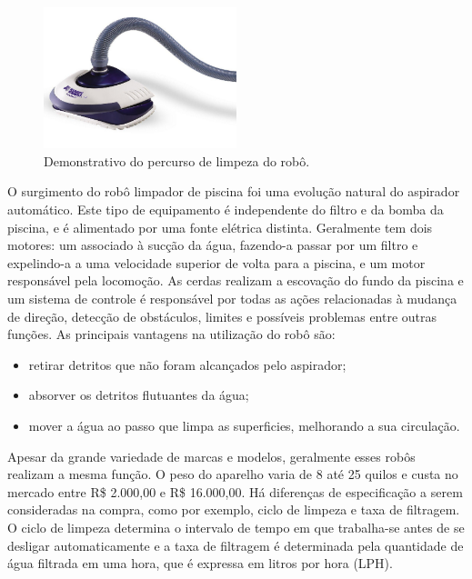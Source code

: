 \begin{figure}[h]
    \centering
    \includegraphics[width=0.5\textwidth]{figures/limpa_piscina_auto.png}
    \caption{Demonstrativo do percurso de limpeza do robô.}
    \label{fig:schema-way-robot}
  \end{figure}

O surgimento do robô limpador de piscina foi uma evolução natural do aspirador 
automático. Este tipo de equipamento é independente do filtro e da bomba da 
piscina, e é alimentado por uma fonte elétrica distinta. Geralmente tem dois 
motores: um associado à sucção da água, fazendo-a passar por um filtro e 
expelindo-a a uma velocidade superior de volta para a piscina, e um motor 
responsável pela locomoção. As cerdas realizam a escovação do fundo da piscina 
e um sistema de controle é responsável por todas as ações relacionadas à 
mudança de direção, detecção de obstáculos, limites e possíveis problemas entre
outras funções. As principais vantagens na utilização do robô são:

\begin{itemize}
  \item retirar detritos que não foram alcançados pelo aspirador;
  \item absorver os detritos flutuantes da água;
  \item mover a água ao passo que limpa as superficies, melhorando a sua circulação.
\end{itemize}
 
Apesar da grande variedade de marcas e modelos, geralmente esses robôs realizam
a mesma função. O peso do aparelho varia de 8 até 25 quilos e  custa no mercado
entre  R\$ 2.000,00 e  R\$ 16.000,00. Há diferenças de especificação a serem 
consideradas na compra, como por exemplo, ciclo de limpeza e taxa de filtragem. 
O ciclo de limpeza determina o intervalo de tempo em que trabalha-se antes de se desligar automaticamente e a taxa de filtragem é determinada pela quantidade de água filtrada em uma 
hora, que é expressa em litros por hora (LPH).


